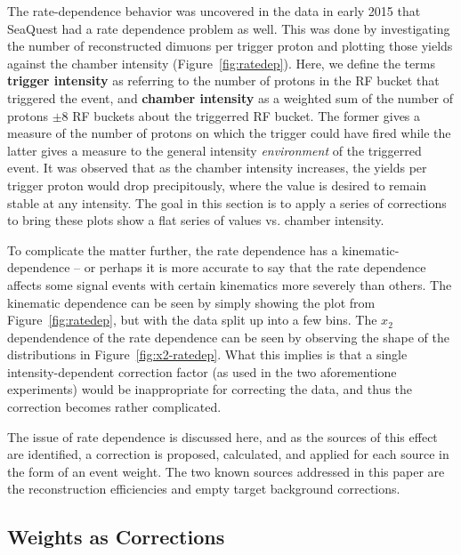 The rate-dependence behavior was uncovered in the data in early 2015 that SeaQuest had a rate dependence problem as well. This was done by investigating the number of reconstructed dimuons per trigger proton and plotting those yields against the chamber intensity (Figure~\ref{fig:ratedep}). Here, we define the terms \textbf{trigger intensity} as referring to the number of protons in the RF bucket that triggered the event, and \textbf{chamber intensity} as a weighted sum of the number of protons $\pm$8 RF buckets about the triggerred RF bucket. The former gives a measure of the number of protons on which the trigger could have fired while the latter gives a measure to the general intensity \emph{environment} of the triggerred event. It was observed that as the chamber intensity increases, the yields per trigger proton would drop precipitously, where the value is desired to remain stable at any intensity. The goal in this section is to apply a series of corrections to bring these plots show a flat series of values vs. chamber intensity.

To complicate the matter further, the rate dependence has a kinematic-dependence -- or perhaps it is more accurate to say that the rate dependence affects some signal events with certain kinematics more severely than others. The kinematic dependence can be seen by simply showing the plot from Figure~\ref{fig:ratedep}, but with the data split up into a few bins. The $x_2$ dependendence of the rate dependence can be seen by observing the shape of the distributions in Figure~\ref{fig:x2-ratedep}. What this implies is that a single intensity-dependent correction factor (as used in the two aforementione experiments) would be inappropriate for correcting the data, and thus the correction becomes rather complicated.

The issue of rate dependence is discussed here, and as the sources of this effect are identified, a correction is proposed, calculated, and applied for each source in the form of an event weight. The two known sources addressed in this paper are the reconstruction efficiencies and empty target background corrections.

\subsection{Weights as Corrections}

